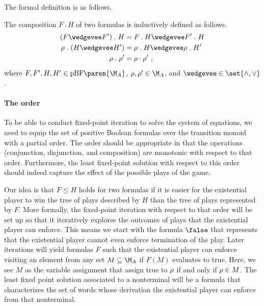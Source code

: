 \documentclass[../../diss.tex]{subfiles}
\begin{document}
The formal definition is as follows.

\begin{definition}%
\label{Definition:CFComp}%
    The composition $F \comp H$ of two formulas is inductively defined as follows.
    \begin{align*}
        (F \wedgevee F') \comp H &= F \comp H \wedgevee F' \comp H
        \\
        \tbox \comp (H \wedgevee H') &= \tbox \comp H \wedgevee \tbox \comp H'
        \\
        \tbox \comp \tbox' &= \tbox \relcomp\tbox'
        \ ,
    \end{align*}
    where $F,F',H,H' \in \pBF\paren{\nfatransmonoid{A}}$, $\tbox,\tbox' \in \nfatransmonoid{A}$, and ${\wedgevee} \in \set{\wedge, \vee}$.
\end{definition}

\paragraph{The order}

To be able to conduct fixed-point iteration to solve the system of equations, we need to equip the set of positive Boolean formulas over the transition monoid with a partial order.
The order should be appropriate in that the operations (conjunction, disjunction, and composition) are monotonic with respect to that order.
Furthermore, the least fixed-point solution with respect to this order should indeed capture the effect of the possible plays of the game.

Our idea is that $F \leq H$ holds for two formulas if it is easier for the existential player to win the tree of plays described by $H$ than the tree of plays represented by $F$.
More formally, the fixed-point iteration with respect to that order will be set up so that it iteratively explores the outcomes of plays that the existential player can enforce.
This means we start with the formula $\false$ that represents that the existential player cannot even enforce termination of the play.
Later iterations will yield formulas $F$ such that the existential player can enforce visiting an element from any set $M \subseteq \nfatransmonoid{A}$ if $F(M)$ evaluates to true.
Here, we see $M$ as the variable assignment that assign true to $\tbox$ if and only if $\tbox \in M$.
The least fixed point solution associated to a nonterminal will be a formula that characterizes the set of words whose derivation the existential player can enforce from that nonterminal.
\end{document}
